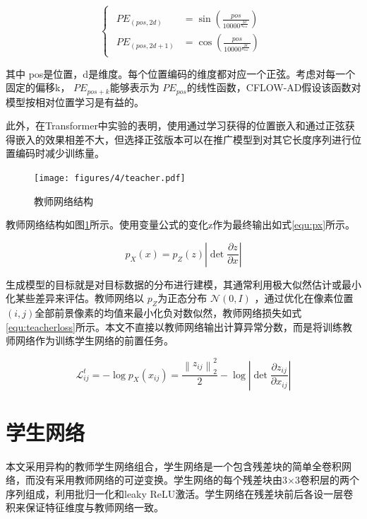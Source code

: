 \begin{equation}\label{equ:positionencoder}
    \left\{\begin{matrix}
    \begin{aligned}P E_{(p o s, 2 d)} & =\sin \left(\frac{p o s}{10000^{\frac{2 d}{n_{\text {feat }}}}}  \right) \\P E_{(p o s, 2 d+1)} & =\cos \left(\frac{p o s}{10000^{\frac{2 d}{n_{\text {feat }}}}}  \right)\end{aligned}
\end{matrix}\right.
\end{equation}

其中 pos是位置，d是维度。每个位置编码的维度都对应一个正弦。考虑对每一个固定的偏移k， $P E_{p o s+k}$能够表示为 $P E_{p o s}$的线性函数，CFLOW-AD假设该函数对模型按相对位置学习是有益的。

此外，在Transformer中实验的表明，使用通过学习获得的位置嵌入和通过正弦获得嵌入的效果相差不大，但选择正弦版本可以在推广模型到对其它长度序列进行位置编码时减少训练量。


\begin{figure}[htbp]
    \centering
    \texttt{[image: figures/4/teacher.pdf]}
    \caption{教师网络结构}
    \label{fig:nf-teacher}
\end{figure}

教师网络结构如图\ref{fig:nf-teacher}所示。使用变量公式的变化z作为最终输出如式\ref{equ:px}所示。

\begin{equation}\label{equ:px}
    p_{X}(x)=p_{Z}(z)\left|\operatorname{det} \frac{\partial z}{\partial x}\right|
\end{equation}

生成模型的目标就是对目标数据的分布进行建模，其通常利用极大似然估计或最小化某些差异来评估。教师网络以 $p_{Z}$为正态分布 $\mathcal{N}(0, I)$ ，通过优化在像素位置 $(i,j)$全部前景像素的均值来最小化负对数似然，教师网络损失如式\ref{equ:teacherloss}所示。本文不直接以教师网络输出计算异常分数，而是将训练教师网络作为训练学生网络的前置任务。

\begin{equation}\label{equ:teacherloss}
    \mathcal{L}_{i j}^{t}=-\log p_{X}\left(x_{i j}\right)=\frac{\left\|z_{i j}\right\|_{2}^{2}}{2}-\log \left|\operatorname{det} \frac{\partial z_{i j}}{\partial x_{i j}}\right|
\end{equation}


\section{学生网络}
本文采用异构的教师学生网络组合，学生网络是一个包含残差块的简单全卷积网络，而没有采用教师网络的可逆变换。学生网络的每个残差块由3×3卷积层的两个序列组成，利用批归一化\cite{ioffeBatchNormalizationAccelerating2015}和leaky ReLU激活。学生网络在残差块前后各设一层卷积来保证特征维度与教师网络一致。


